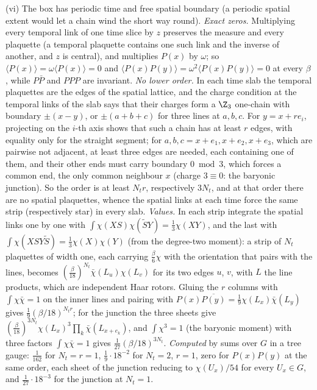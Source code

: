 (vi) The box has periodic time and free spatial boundary (a periodic spatial extent would let a chain wind the short way round). \emph{Exact zeros.} Multiplying every temporal link of one time slice by $z$ preserves the measure and every plaquette (a temporal plaquette contains one such link and the inverse of another, and $z$ is central), and multiplies $P(x)$ by $\omega$; so $\langle P(x)\rangle = \omega\langle P(x)\rangle = 0$ and $\langle P(x)P(y)\rangle = \omega^2\langle P(x)P(y)\rangle = 0$ at every $\beta$, while $P\bar P$ and $PPP$ are invariant. \emph{No lower order.} In each time slab the temporal plaquettes are the edges of the spatial lattice, and the charge condition at the temporal links of the slab says that their charges form a $\Z_3$ one-chain with boundary $\pm(x - y)$, or $\pm(a + b + c)$ for three lines at $a, b, c$. For $y = x + re_i$, projecting on the $i$-th axis shows that such a chain has at least $r$ edges, with equality only for the straight segment; for $a, b, c = x + e_1, x + e_2, x + e_3$, which are pairwise not adjacent, at least three edges are needed, each containing one of them, and their other ends must carry boundary $0 \bmod 3$, which forces a common end, the only common neighbour $x$ (charge $3 \equiv 0$: the baryonic junction). So the order is at least $N_tr$, respectively $3N_t$, and at that order there are no spatial plaquettes, whence the spatial links at each time force the same strip (respectively star) in every slab. \emph{Values.} In each strip integrate the spatial links one by one with $\int\chi(XS)\chi(\widetilde{S}Y) = \tfrac13\chi(XY)$, and the last with $\int\chi(XSY\widetilde{S}) = \tfrac13\chi(X)\chi(Y)$ (from the degree-two moment): a strip of $N_t$ plaquettes of width one, each carrying $\tfrac\beta6\chi$ with the orientation that pairs with the lines, becomes $(\tfrac\beta{18})^{N_t}\bar\chi(L_u)\chi(L_v)$ for its two edges $u$, $v$, with $L$ the line products, which are independent Haar rotors. Gluing the $r$ columns with $\int\chi\bar\chi = 1$ on the inner lines and pairing with $P(x)\overline{P(y)} = \tfrac19\chi(L_x)\bar\chi(L_y)$ gives $\tfrac19(\beta/18)^{N_tr}$; for the junction the three sheets give $(\tfrac\beta{18})^{3N_t}\chi(L_x)^3\prod_k\bar\chi(L_{x+e_k})$, and $\int\chi^3 = 1$ (the baryonic moment) with three factors $\int\chi\bar\chi = 1$ gives $\tfrac1{27}(\beta/18)^{3N_t}$. \emph{Computed} by sums over $G$ in a tree gauge: $\tfrac1{162}$ for $N_t = r = 1$, $\tfrac19\cdot18^{-2}$ for $N_t = 2$, $r = 1$, zero for $P(x)P(y)$ at the same order, each sheet of the junction reducing to $\chi(U_x)/54$ for every $U_x \in G$, and $\tfrac1{27}\cdot18^{-3}$ for the junction at $N_t = 1$.

